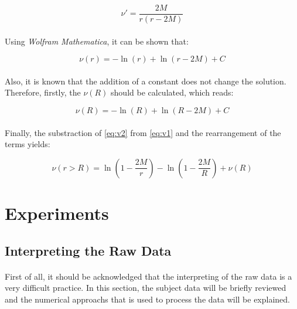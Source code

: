 \documentclass[letterpaper,12pt]{article}
\begin{document}
\begin{equation*}
    \nu' = \frac{2M}{r\left(r - 2M\right)}
\end{equation*}

\paragraph{} Using \textit{Wolfram Mathematica}, it can be shown that:

\begin{equation}
    \label{eq:v1}
    \nu(r) = -\ln(r) + \ln(r -2M) + C
\end{equation}

\paragraph{} Also, it is known that the addition of a constant does not change the solution. Therefore, firstly, the $\nu(R)$ should be calculated, which reads:

\begin{equation}
    \label{eq:v2}
    \nu(R) = -\ln(R) + \ln(R -2M) + C
\end{equation}

\paragraph{}Finally, the substraction of \eqref{eq:v2} from \eqref{eq:v1} and the rearrangement of the terms yields:

\begin{equation*}
    \nu(r>R) = \ln(1-\frac{2M}{r}) - \ln(1-\frac{2M}{R})+\nu(R) 
\end{equation*}



\section{Experiments}
\label{sec:exps}
\subsection{Interpreting the Raw Data}
\paragraph{} First of all, it should be acknowledged that the interpreting of the raw data is a very difficult practice. In this section, the subject data will be briefly reviewed and the numerical approachs that is used to process the data will be explained.
\end{document}
